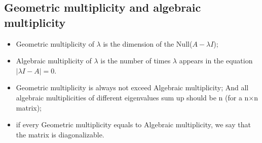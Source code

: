 \documentclass{article}
\begin{document}
    \subsection*{Geometric multiplicity and algebraic multiplicity}
    \begin{itemize}
        \item Geometric multiplicity of $\lambda$ is the dimension of the Null($A-\lambda I$); 
        \item Algebraic multiplicity of $\lambda$ is the number of times $\lambda$ appears in the equation $|\lambda I-A|=0$. 
        \item Geometric multiplicity is always not exceed Algebraic multiplicity; And all algebraic multiplicities of different eigenvalues sum up should be n (for a n$\times$n matrix); 
        \item if every Geometric multiplicity equals to Algebraic multiplicity, we say that the matrix is diagonalizable. 
    \end{itemize}
\end{document}
